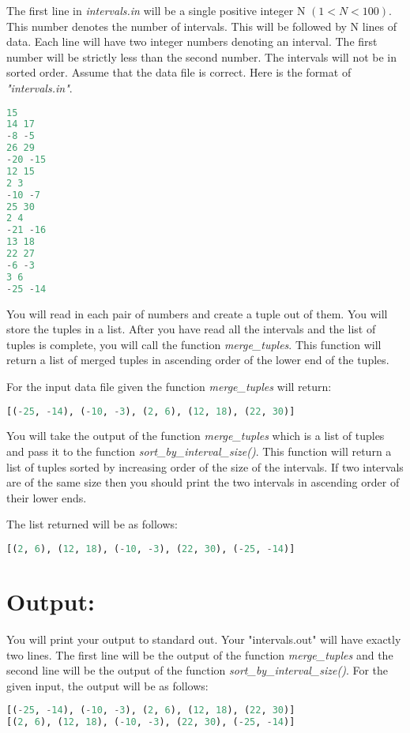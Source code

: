 \documentclass[12pt]{article}
\begin{document}
The first line in \textit{intervals.in} will be a single positive integer N $(1 < N < 100)$. This number denotes the number of intervals. 
This  will be followed by N lines of data. Each line will have two integer numbers denoting an interval. The first number will be strictly less than 
the second number. The intervals will not be in sorted order. Assume that the data file is correct. Here is the format of \textit{"intervals.in"}.

\begin{lstlisting}[language=Python]
15
14 17
-8 -5
26 29
-20 -15
12 15
2 3
-10 -7
25 30
2 4
-21 -16
13 18
22 27
-6 -3
3 6
-25 -14
\end{lstlisting}

You will read in each pair of numbers and create a tuple out of them. You will store the tuples in a list. After you have read all the intervals and 
the list of tuples is complete, you will call the function \textit{merge\_tuples}. This function will return a list of merged tuples in
ascending order of the lower end of the tuples.

For the input data file given the function \textit{merge\_tuples} will return:

\begin{lstlisting}[language=Python]
[(-25, -14), (-10, -3), (2, 6), (12, 18), (22, 30)]
\end{lstlisting}

You will take the output of the function \textit{merge\_tuples}  which is
a list of tuples and pass it to the function \textit{sort\_by\_interval\_size()}.
This function will return a list of tuples sorted by increasing order of the size of the intervals. If two intervals are of the same size then you 
should print the two intervals in ascending order of their lower ends. 

The list returned will be as follows:

\begin{lstlisting}[language=Python]
[(2, 6), (12, 18), (-10, -3), (22, 30), (-25, -14)]
\end{lstlisting}




\section*{Output:}
You will print your output to standard out. Your "intervals.out" will have exactly two lines. 
The first line will be the output of the function \textit{merge\_tuples} and the second line will be the output of the function \textit{sort\_by\_interval\_size()}. For the given input, the output will be as follows:


\begin{lstlisting}[language=Python]
[(-25, -14), (-10, -3), (2, 6), (12, 18), (22, 30)]
[(2, 6), (12, 18), (-10, -3), (22, 30), (-25, -14)]
\end{lstlisting}
  




\end{document}

